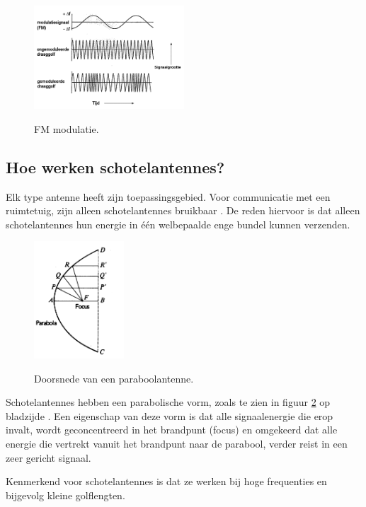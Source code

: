 \begin{figure}[ht]
  \centering
  \includegraphics[width=0.5\textwidth]{voorbeeld_figuren/FMwit}
  \caption{FM modulatie.}
  \cite{FM}
  \label{fig:FM}
\end{figure}


\subsection{Hoe werken schotelantennes?}

Elk type antenne heeft zijn toepassingsgebied. Voor communicatie met een ruimtetuig, zijn alleen schotelantennes bruikbaar \cite{kennedy}. De reden hiervoor is dat alleen schotelantennes hun energie in één welbepaalde enge bundel kunnen verzenden.

\begin{figure}[ht]
  \centering
  \includegraphics[width=0.3\textwidth]{voorbeeld_figuren/paraboolantenne_doorsnede}
  \caption{Doorsnede van een paraboolantenne.}
  \cite{kennedy}
  \label{fig:parabool}
\end{figure}

Schotelantennes hebben een parabolische vorm, zoals te zien in figuur \ref{fig:parabool} op bladzijde \pageref{fig:parabool}. Een eigenschap van deze vorm is dat alle signaalenergie die erop invalt, wordt geconcentreerd in het brandpunt (focus) en omgekeerd dat alle energie die vertrekt vanuit het brandpunt naar de parabool, verder reist in een zeer gericht signaal.

Kenmerkend voor schotelantennes is dat ze werken bij hoge frequenties en bijgevolg kleine golflengten.

